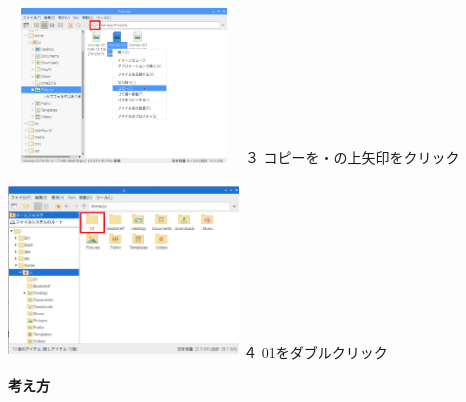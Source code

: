 \documentclass[a4paper,12pt]{jarticle}
\begin{document}
\bigskip

\begin{minipage}{6.413cm}
  \includegraphics[width=6.146cm,height=4.114cm]{textbook-img163.png}
  \newline
  ３
  コピーを・の上矢印をクリック
\end{minipage}
\hspace{10mm}
\begin{minipage}{6.5cm}
  \includegraphics[width=6.1cm,height=4.646cm]{textbook-img167.png}
  \newline
  ４ 01をダブルクリック
\end{minipage}

\clearpage
\flushleft

\textbf{考え方}


\bigskip


\bigskip


\bigskip
\end{document}
